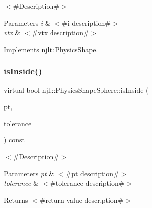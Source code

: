 $<$\#\+Description\#$>$


\begin{DoxyParams}{Parameters}
{\em i} & $<$\#i description\#$>$ \\
\hline
{\em vtx} & $<$\#vtx description\#$>$ \\
\hline
\end{DoxyParams}


Implements \mbox{\hyperlink{classnjli_1_1_physics_shape_acb05a16bdbfa5cee6dcbab5c253eb78e}{njli\+::\+Physics\+Shape}}.

\mbox{\label{classnjli_1_1_physics_shape_sphere_a10b233e9fc9b6dc6ac593fed898b472b}} 
\subsubsection{\texorpdfstring{is\+Inside()}{isInside()}}
{\footnotesize\ttfamily virtual bool njli\+::\+Physics\+Shape\+Sphere\+::is\+Inside (\begin{DoxyParamCaption}\item[{const bt\+Vector3 \&}]{pt,  }\item[{\mbox{\hyperlink{_util_8h_a5f6906312a689f27d70e9d086649d3fd}{f32}}}]{tolerance }\end{DoxyParamCaption}) const\hspace{0.3cm}{\ttfamily [virtual]}}

$<$\#\+Description\#$>$


\begin{DoxyParams}{Parameters}
{\em pt} & $<$\#pt description\#$>$ \\
\hline
{\em tolerance} & $<$\#tolerance description\#$>$\\
\hline
\end{DoxyParams}
\begin{DoxyReturn}{Returns}
$<$\#return value description\#$>$ 
\end{DoxyReturn}
\mbox{\label{classnjli_1_1_physics_shape_sphere_a9208b4f02344bc95dc5090d0f2fb17fa}} 
